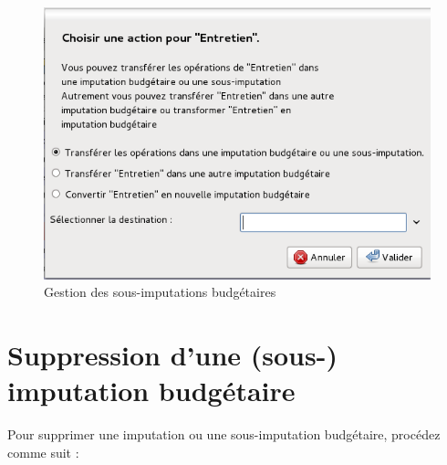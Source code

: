 \ifIllustration
\begin{figure}[hbp]
\begin{center}
\includegraphics[scale=0.48]{image/screenshot/budgetarylines_management}
\end{center}
\caption{Gestion des sous-imputations budgétaires}
\label{budgetarylines-management-img}
\end{figure}
\fi


\section{Suppression d'une (sous-) imputation budgétaire\label{budgetarylines-delete}}


Pour supprimer une imputation ou une sous-imputation budgétaire, procédez comme suit :

